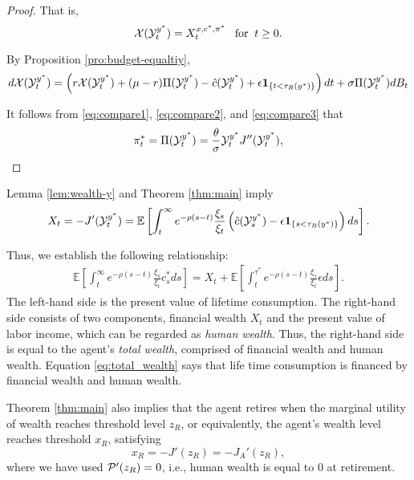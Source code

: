 \documentclass[a4paper,report, 11pt]{article}
\def\e{\epsilon}
\def\m{\mu}
\def\s{\sigma}
\def\t{\theta}
\def\be{\begin{eqnarray}}
\def\ee{\end{eqnarray}}
\begin{document}
\begin{proof}
    That is, 
    \begin{equation}\label{eq:compare2}
    {\cal X}({\cal Y}_t^{y^*})=X_t^{x,c^*,\pi^*}\;\;\;\mbox{for}\;\;t\ge0.
    \end{equation}
    
    By Proposition \ref{pro:budget-equaltiy}, 
    \begin{equation}\label{eq:compare3}
    	d{\cal X}({\cal Y}_t^{y^*})=\left( r{\cal X}({\cal Y}_t^{y^*})+(\m-r)\Pi({\cal Y}_t^{y^*})-\hat{c}({\cal Y}_t^{y^*})+ \e{\bf 1}_{\{t<\tau_R(y^*)\}}\right)dt+\s \Pi({\cal Y}_t^{y^*}) dB_t
    \end{equation}
    
    It follows from \eqref{eq:compare1}, \eqref{eq:compare2}, and \eqref{eq:compare3} that 
    $$
    \pi_t^*=\Pi({\cal Y}_t^{y^*})=\frac{\t}{\s}{\cal Y}_t^{y^*}J''({\cal Y}_t^{y^*}),
    $$
    
	
\end{proof}

 Lemma \ref{lem:wealth-y} and Theorem \ref{thm:main} imply
$$
X_t = -J^{\prime}({\cal Y}_t^{y^*})=\mathbb{E}\left[\int_t^{\infty} e^{-\rho (s-t) }\frac{\xi_s}{\xi_t} \left(\hat{c}({\cal Y}_s^{y^*})-\e{\bf 1}_{\{s<\tau_R(y^*)\}}  \right)ds\right].
$$

Thus, we establish the following relationship:
\be\label{eq:total_wealth}
 \mathbb{E}\left[\int_t^\infty e^{-\rho (s-t) }\frac{\xi_s}{\xi_t} c_s^*ds\right] =X_t + \mathbb{E}\left[\int_t^{\tau^*} e^{-\rho (s-t) }\frac{\xi_s}{\xi_t} \e ds\right].
\ee
The left-hand side is the present value of lifetime consumption. The right-hand side consists of two components, financial wealth $X_t$ and the present value of labor income, which can be regarded as {\em human wealth}.  Thus, the right-hand side is equal to the agent's {\em total wealth}, comprised of financial wealth and human wealth. Equation \eqref{eq:total_wealth} says that life time consumption is financed by financial wealth and human wealth. 



Theorem \ref{thm:main} also implies that the agent retires when the marginal utility of wealth reaches threshold level $z_R$, or equivalently, the agent's wealth level reaches threshold  $x_R$, satisfying
\begin{equation}\label{eq:retirement-x}
x_R = -J'(z_R)=-J_A'(z_R),
\end{equation}
where we have used ${\cal P}'(z_R)=0$, i.e., human wealth is equal to 0 at retirement. 
\end{document}
